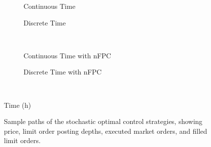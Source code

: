 \begin{figure}%
\centering%
\begin{subfigure}[b]{.4\linewidth}%
  \setlength\figureheight{\linewidth}%
  \setlength\figurewidth{\linewidth}%
  \caption{Continuous Time}%
\end{subfigure}%
\hspace{1.5cm}%
\begin{subfigure}[b]{.4\linewidth}%
  \setlength\figureheight{\linewidth}%
  \setlength\figurewidth{\linewidth}%
  \caption{Discrete Time}%
\end{subfigure}\\%
\vspace{1cm}%
\begin{subfigure}[b]{.4\linewidth}%
  \setlength\figureheight{\linewidth}%
  \setlength\figurewidth{\linewidth}%
  \caption{Continuous Time with nFPC}%
\end{subfigure}%
\hspace{1.5cm}%
\begin{subfigure}[b]{.4\linewidth}%
  \setlength\figureheight{\linewidth}%
  \setlength\figurewidth{\linewidth}%
  \caption{Discrete Time with nFPC}%
\end{subfigure}\\%
\leavevmode{}\hspace{0pt plus 1filll}\null%

Time (h)

\vspace{1cm}%
\begin{subfigure}{\linewidth}%
  \centering%
  \setlength\figureheight{\linewidth}%
  \setlength\figurewidth{\linewidth}%
\end{subfigure}%
  \caption[Detailed sample paths of the stochastic optimal control strategies]{Sample paths of the stochastic optimal control strategies, showing price, limit order posting depths, executed market orders, and filled limit orders.}\label{fig:samplepath_paths}%
\end{figure}
